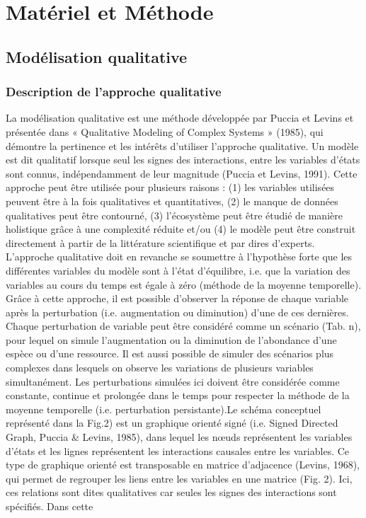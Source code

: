 
\chapter{Matériel et Méthode}
    \section{Modélisation qualitative}
        \subsection{Description de l'approche qualitative}
La modélisation qualitative est une méthode développée par Puccia et Levins et présentée dans « Qualitative Modeling of Complex Systems » (1985), qui démontre la pertinence et les intérêts d’utiliser l’approche qualitative. Un modèle est dit qualitatif lorsque seul les signes des interactions, entre les variables d’états sont connus, indépendamment de leur magnitude (Puccia et Levins, 1991). Cette approche peut être utilisée pour plusieurs raisons : (1) les variables utilisées peuvent être à la fois qualitatives et quantitatives, (2) le manque de données qualitatives peut être contourné, (3) l’écosystème peut être étudié de manière holistique grâce à une complexité réduite et/ou (4) le modèle peut être construit directement à partir de la littérature scientifique et par dires d’experts. L’approche qualitative doit en revanche se soumettre à l’hypothèse forte que les différentes variables du modèle sont à l’état d’équilibre, i.e. que la variation des variables au cours du temps est égale à zéro (méthode de la moyenne temporelle). Grâce à cette approche, il est possible d’observer la réponse de chaque variable après la perturbation (i.e. augmentation ou diminution) d’une de ces dernières. Chaque perturbation de variable peut être considéré comme un scénario (Tab. n), pour lequel on simule l’augmentation ou la diminution de l’abondance d’une espèce ou d’une ressource. Il est aussi possible de simuler des scénarios plus complexes dans lesquels on observe les variations de plusieurs variables simultanément. Les perturbations simulées ici doivent être considérée comme constante, continue et prolongée dans le temps pour respecter la méthode de la moyenne temporelle (i.e. perturbation persistante).Le schéma conceptuel représenté dans la Fig.2) est un graphique orienté signé (i.e. Signed Directed Graph, Puccia & Levins, 1985), dans lequel les nœuds représentent les variables d’états et les lignes représentent les interactions causales entre les variables. Ce type de graphique orienté est transposable en matrice d’adjacence (Levins, 1968), qui permet de regrouper les liens entre les variables en une matrice (Fig. 2). Ici, ces relations sont dites qualitatives car seules les signes des interactions sont spécifiés. Dans cette 


